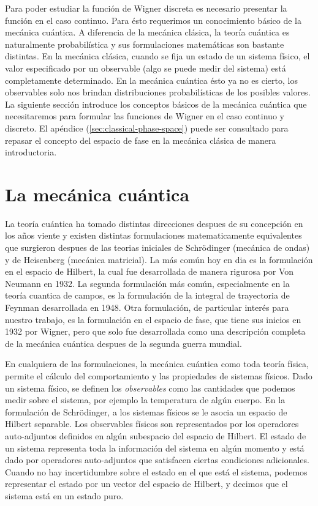 \documentclass[a4paper,11pt]{report}
\begin{document}
  Para poder estudiar la función de Wigner discreta es
  necesario presentar la función en el caso continuo. Para
  ésto requerimos un conocimiento básico de la mecánica
  cuántica. A diferencia de la mecánica clásica, la teoría
  cuántica es naturalmente probabilística y sus
  formulaciones matemáticas son bastante distintas. En la
  mecánica clásica, cuando se fija un estado de un sistema
  físico, el valor especificado por un observable (algo se
  puede medir del sistema) está completamente determinado.
  En la mecánica cuántica ésto ya no es cierto, los
  observables solo nos brindan distribuciones
  probabilísticas de los posibles valores. La siguiente
  sección introduce los conceptos básicos de la mecánica
  cuántica que necesitaremos para formular las funciones de
  Wigner en el caso continuo y discreto. El apéndice
  (\ref{sec:classical-phase-space}) puede ser consultado
  para repasar el concepto del espacio de fase en la
  mecánica clásica de manera introductoria. 

  \section{La mecánica cuántica}

  La teoría cuántica ha tomado distintas direcciones despues
  de su concepción en los años viente y existen distintas
  formulaciones matematicamente equivalentes que surgieron
  despues de las teorias iniciales de Schrödinger (mecánica
  de ondas) y de Heisenberg (mecánica matricial).  La más
  común hoy en dia es la formulación en el espacio de
  Hilbert, la cual fue desarrollada de manera rigurosa por
  Von Neumann en 1932.  La segunda formulación más común,
  especialmente en la teoría cuantica de campos, es la
  formulación de la integral de trayectoria de Feynman
  desarrollada en 1948.  Otra formulación, de particular
  interés para nuestro trabajo, es la formulación en el
  espacio de fase, que tiene sus inicios en 1932 por Wigner,
  pero que solo fue desarrollada como una descripción
  completa de la mecánica cuántica despues de la segunda
  guerra mundial. 

  En cualquiera de las formulaciones, la mecánica cuántica
  como toda teoría física, permite el cálculo del
  comportamiento y las propiedades de sistemas físicos. Dado
  un sistema físico, se definen los \textit{observables}
  como las cantidades que podemos medir sobre el sistema,
  por ejemplo la temperatura de algún cuerpo. En la
  formulación de Schrödinger, a los sistemas físicos se le
  asocia un espacio de Hilbert separable. Los observables
  físicos son representados por los operadores auto-adjuntos
  definidos en algún subespacio del espacio de Hilbert. El
  estado de un sistema representa toda la información del
  sistema en algún momento y está dado por operadores
  auto-adjuntos que satisfacen ciertas condiciones
  adicionales. Cuando no hay incertidumbre sobre el estado
  en el que está el sistema, podemos representar el estado
  por un vector del espacio de Hilbert, y decimos que el
  sistema está en un estado puro.
\end{document}
